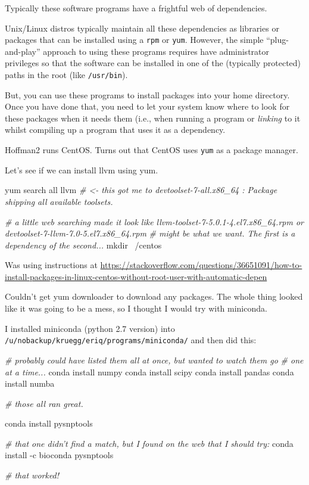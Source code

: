 \documentclass[]{krantz}
\makeatletter
\newenvironment{Shaded}{\begin{snugshade}}{\end{snugshade}}
\newcommand{\CommentTok}[1]{\textcolor[rgb]{0.37,0.37,0.37}{\textit{#1}}}
\newcommand{\ExtensionTok}[1]{#1}
\newcommand{\FunctionTok}[1]{\textcolor[rgb]{0,0,0}{#1}}
\newcommand{\NormalTok}[1]{#1}
\newenvironment{kframe}{%
\medskip{}
\setlength{\fboxsep}{.8em}
 \def\at@end@of@kframe{}%
 \ifinner\ifhmode%
  \def\at@end@of@kframe{\end{minipage}}%
  \begin{minipage}{\columnwidth}%
 \fi\fi%
 \def\FrameCommand##1{\hskip\@totalleftmargin \hskip-\fboxsep
 \colorbox{shadecolor}{##1}\hskip-\fboxsep
     \hskip-\linewidth \hskip-\@totalleftmargin \hskip\columnwidth}%
 \MakeFramed {\advance\hsize-\width
   \@totalleftmargin\z@ \linewidth\hsize
   \@setminipage}}%
 {\par\unskip\endMakeFramed%
 \at@end@of@kframe}
\renewenvironment{Shaded}{\begin{kframe}}{\end{kframe}}
\makeatother
\begin{document}
Typically these software programs have a frightful web of dependencies.

Unix/Linux distros typically maintain all these dependencies as libraries or packages
that can be installed using a \texttt{rpm} or \texttt{yum}. However, the simple ``plug-and-play'' approach
to using these programs requires have administrator privileges so that the software can
be installed in one of the (typically protected) paths in the root (like \texttt{/usr/bin}).

But, you can use these programs to install packages into your home directory. Once you have done
that, you need to let your system know where to look for these packages when it needs them
(i.e., when running a program or \emph{linking} to it whilst compiling up a program that uses it
as a dependency.

Hoffman2 runs CentOS. Turns out that CentOS uses \texttt{yum} as a package manager.

Let's see if we can install llvm using yum.

\begin{Shaded}
\begin{Highlighting}[]
\ExtensionTok{yum}\NormalTok{ search all llvm }\CommentTok{# <- this got me to devtoolset-7-all.x86_64 : Package shipping all available toolsets.}

\CommentTok{# a little web searching made it look like llvm-toolset-7-5.0.1-4.el7.x86_64.rpm or devtoolset-7-llvm-7.0-5.el7.x86_64.rpm}
\CommentTok{# might be what we want.  The first is a dependency of the second...}
\FunctionTok{mkdir}\NormalTok{ ~/centos}
\end{Highlighting}
\end{Shaded}

Was using instructions at \url{https://stackoverflow.com/questions/36651091/how-to-install-packages-in-linux-centos-without-root-user-with-automatic-depen}

Couldn't get yum downloader to download any packages. The whole thing looked like it was going to
be a mess, so I thought I would try with miniconda.

I installed miniconda (python 2.7 version) into \texttt{/u/nobackup/kruegg/eriq/programs/miniconda/} and then did this:

\begin{Shaded}
\begin{Highlighting}[]
\CommentTok{# probably could have listed them all at once, but wanted to watch them go }
\CommentTok{# one at a time...}
\ExtensionTok{conda}\NormalTok{ install numpy}
\ExtensionTok{conda}\NormalTok{ install scipy}
\ExtensionTok{conda}\NormalTok{ install pandas}
\ExtensionTok{conda}\NormalTok{ install numba}

\CommentTok{# those all ran great.}

\ExtensionTok{conda}\NormalTok{ install pysnptools}

\CommentTok{# that one didn't find a match, but I found on the web that I should try:}
\ExtensionTok{conda}\NormalTok{ install -c bioconda pysnptools }

\CommentTok{# that worked!}
\end{Highlighting}
\end{Shaded}
\end{document}

